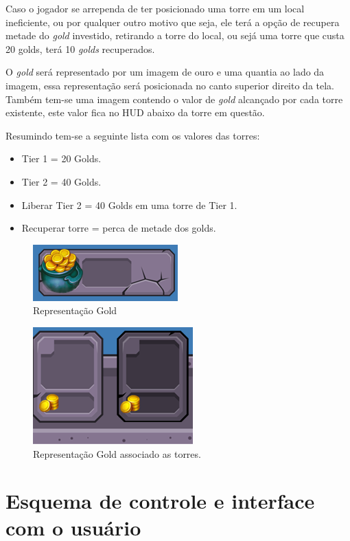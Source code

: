 \documentclass[11pt]{article} %
\begin{document}
Caso o jogador se arrependa de ter posicionado uma torre em um local ineficiente, ou por qualquer outro motivo que seja, ele terá a opção de recupera metade do \textit{gold} investido, retirando a torre do local, ou sejá uma torre que custa 20 golds, terá 10 \textit{golds} recuperados.
 
 
O \textit{gold} será representado por um imagem de ouro e uma quantia ao lado da imagem, essa representação será posicionada no canto superior direito da tela. Também tem-se uma imagem contendo o valor de \textit{gold} alcançado por cada torre existente, este valor fica no HUD abaixo da torre em questão.

Resumindo tem-se a seguinte lista com os valores das torres:
\begin{itemize}
 \item Tier 1 = 20 Golds.
 \item Tier 2 = 40 Golds.
 \item Liberar Tier 2 = 40 Golds em uma torre de Tier 1.
 \item Recuperar torre = perca de metade dos golds.
\end{itemize} 

\begin{figure}[!htp]
\centering
\includegraphics[scale=1.25]{res/gold.png}
\caption{Representação Gold}
\label{Tela Equip}
\end{figure}

\begin{figure}[!htp]
\centering
\includegraphics[scale=1.0]{res/torresGold.png}
\caption{Representação Gold associado as torres.}
\label{Tela Equip}
\end{figure}

\section{Esquema de controle e interface com o usuário}
\end{document}
